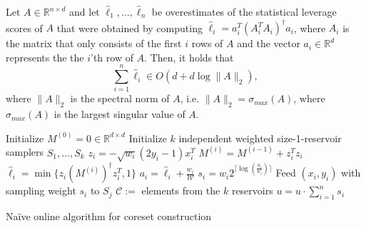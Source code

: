 \begin{lemma}
    \label{lemma:online-scores-sum}
    Let $A \in \mathbb{R}^{n \times d}$ and let
    $\hat{\ell}_1, ..., \hat{\ell}_n$ be overestimates of the statistical
    leverage scores of $A$ that were obtained by computing
    $\hat{\ell}_i = a_i^T (A_i^TA_i)^\dagger a_i$,
    where $A_i$ is the matrix that only consists of the first
    $i$ rows of $A$ and the vector $a_i \in \mathbb{R}^d$ represents the
    the $i$'th row of $A$.
    Then, it holds that
    \begin{equation*}
        \sum_{i=1}^n \hat{\ell}_i \in O(d + d \log \lVert A \rVert_2),
    \end{equation*}
    where $\lVert A \rVert_2$ is the spectral norm of $A$, i.e.
    $\lVert A \rVert_2 = \sigma_{max}(A)$, where $\sigma_{max}(A)$
    is the largest singular value of $A$.

\end{lemma}

\begin{algorithm}
    \DontPrintSemicolon
    Initialize $M^{(0)} = 0 \in \mathbb{R}^{d \times d}$ \;
    Initialize $k$ independent weighted size-1-reservoir
    samplers $S_1, ..., S_k$ \;
     {
        $z_i = -\sqrt{w_i} (2y_i - 1)x_i^T$
        $M^{(i)} = M^{(i-1)} + z_i^T z_i$
        $\hat{\ell}_i = \min\{z_i (M^{(i)})^\dagger z_i^T, 1\}$
        $a_i = \hat{\ell}_i + \frac{w_i}{\mathcal{W}}$
        $s_i = w_i 2^{\lceil\log(\frac{a_i}{w_i})\rceil}$
         {
            Feed $(x_i, y_i)$ with sampling weight $s_i$ to $S_j$ \;
        }
    }
    $\mathcal{C} := $ elements from the $k$ reservoirs \;
    $u = u \cdot \sum_{i=1}^n s_i$
    \caption{Na\"ive online algorithm for coreset construction\label{algo:online-naive}}
\end{algorithm}


